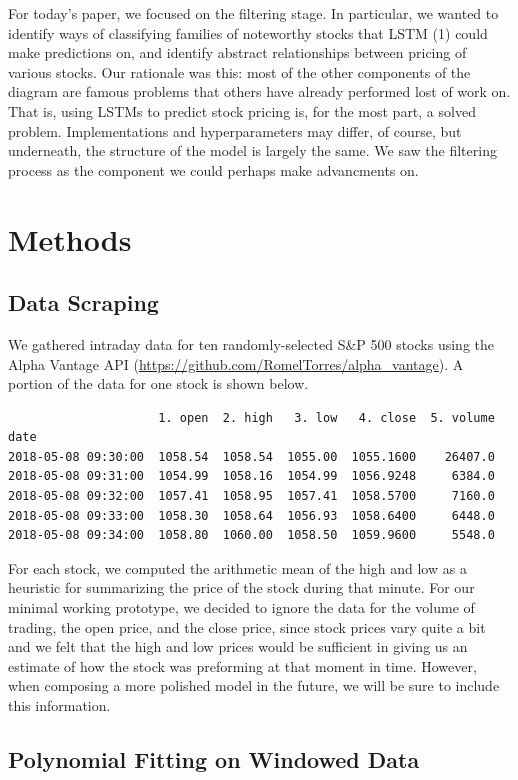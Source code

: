\documentclass[final]{article}
\begin{document}
For today's paper, we focused on the filtering stage. In particular,
we wanted to identify ways of classifying families of noteworthy
stocks that LSTM (1) could make predictions on, and identify abstract
relationships between pricing of various stocks. Our rationale was
this: most of the other components of the diagram are famous problems
that others have already performed lost of work on. That is, using
LSTMs to predict stock pricing is, for the most part, a solved
problem. Implementations and hyperparameters may differ, of course,
but underneath, the structure of the model is largely the same. We saw
the filtering process as the component we could perhaps make
advancments on.
\section{Methods}

\subsection{Data Scraping}
We gathered intraday data for ten randomly-selected S\&P 500 stocks
using the Alpha Vantage API
(\url{https://github.com/RomelTorres/alpha_vantage}). A portion of the
data for one stock is shown below.

\begin{verbatim}
                     1. open  2. high   3. low   4. close  5. volume
date
2018-05-08 09:30:00  1058.54  1058.54  1055.00  1055.1600    26407.0
2018-05-08 09:31:00  1054.99  1058.16  1054.99  1056.9248     6384.0
2018-05-08 09:32:00  1057.41  1058.95  1057.41  1058.5700     7160.0
2018-05-08 09:33:00  1058.30  1058.64  1056.93  1058.6400     6448.0
2018-05-08 09:34:00  1058.80  1060.00  1058.50  1059.9600     5548.0
\end{verbatim}

For each stock, we computed the arithmetic mean of the high and low as
a heuristic for summarizing the price of the stock during that minute.
For our minimal working prototype, we decided to ignore the data for
the volume of trading, the open price, and the close price, since
stock prices vary quite a bit and we felt that the high and low prices
would be sufficient in giving us an estimate of how the stock was
preforming at that moment in time. However, when composing a more
polished model in the future, we will be sure to include this
information.

\subsection{Polynomial Fitting on Windowed Data}
\end{document}
